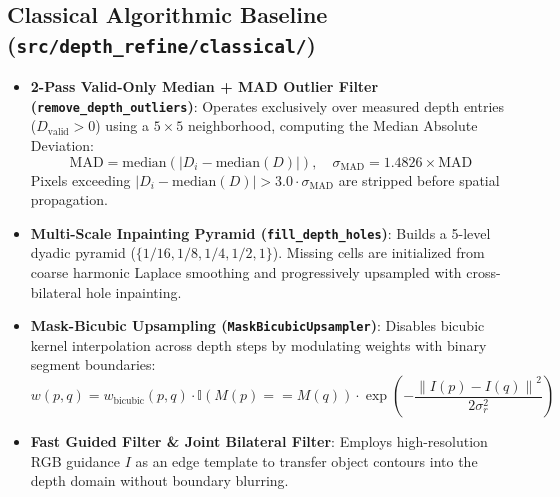 \documentclass[10pt,a4paper]{article}
\begin{document}
\subsection{Classical Algorithmic Baseline (\texttt{src/depth\_refine/classical/})}
\begin{itemize}[leftmargin=*]
    \item \textbf{2-Pass Valid-Only Median + MAD Outlier Filter (\texttt{remove\_depth\_outliers})}: Operates exclusively over measured depth entries ($D_{\text{valid}} > 0$) using a $5\times 5$ neighborhood, computing the Median Absolute Deviation:
    \begin{equation}
        \text{MAD} = \text{median}\left(\left|D_i - \text{median}(D)\right|\right), \quad \sigma_{\text{MAD}} = 1.4826 \times \text{MAD}
    \end{equation}
    Pixels exceeding $|D_i - \text{median}(D)| > 3.0 \cdot \sigma_{\text{MAD}}$ are stripped before spatial propagation.
    \item \textbf{Multi-Scale Inpainting Pyramid (\texttt{fill\_depth\_holes})}: Builds a 5-level dyadic pyramid ($\{1/16, 1/8, 1/4, 1/2, 1\}$). Missing cells are initialized from coarse harmonic Laplace smoothing and progressively upsampled with cross-bilateral hole inpainting.
    \item \textbf{Mask-Bicubic Upsampling (\texttt{MaskBicubicUpsampler})}: Disables bicubic kernel interpolation across depth steps by modulating weights with binary segment boundaries:
    \begin{equation}
        w(p, q) = w_{\text{bicubic}}(p, q) \cdot \mathbb{I}\left(M(p) == M(q)\right) \cdot \exp\left(-\frac{\left\|I(p) - I(q)\right\|^2}{2\sigma_r^2}\right)
    \end{equation}
    \item \textbf{Fast Guided Filter \& Joint Bilateral Filter}: Employs high-resolution RGB guidance $I$ as an edge template to transfer object contours into the depth domain without boundary blurring.
\end{itemize}
\end{document}
